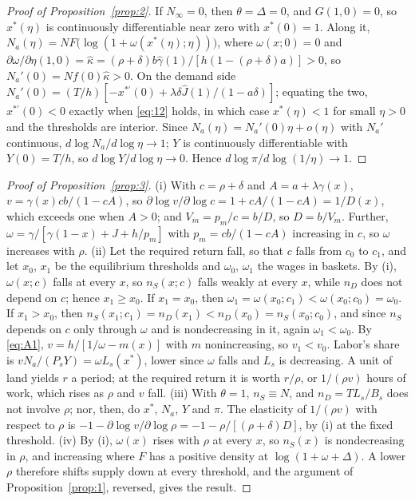 \documentclass[12pt]{article}
\theoremstyle{plain}
\begin{document}
\begin{proof}[Proof of Proposition~\ref{prop:2}]
If $N_\infty=0$, then $\theta=\Delta=0$, and $G(1,0)=0$, so $x^*(\eta)$ is continuously differentiable near zero with $x^*(0)=1$. Along it, $N_a(\eta)=NF\bigl(\log(1+\omega(x^*(\eta);\eta))\bigr)$, where $\omega(x;0)=0$ and $\partial\omega/\partial\eta(1,0)=\hat\kappa=(\rho+\delta)b\hat\gamma(1)/[h(1-(\rho+\delta)a)]>0$, so $N_a'(0)=Nf(0)\hat\kappa>0$. On the demand side $N_a'(0)=(T/h)[-x^{*\prime}(0)+\lambda\delta\hat J(1)/(1-a\delta)]$; equating the two, $x^{*\prime}(0)<0$ exactly when \eqref{eq:12} holds, in which case $x^*(\eta)<1$ for small $\eta>0$ and the thresholds are interior. Since $N_a(\eta)=N_a'(0)\eta+o(\eta)$ with $N_a'$ continuous, $d\log N_a/d\log\eta\to1$; $Y$ is continuously differentiable with $Y(0)=T/h$, so $d\log Y/d\log\eta\to0$. Hence $d\log\pi/d\log(1/\eta)\to1$.
\end{proof}

\begin{proof}[Proof of Proposition~\ref{prop:3}]
(i) With $c=\rho+\delta$ and $A=a+\lambda\gamma(x)$, $v=\gamma(x)cb/(1-cA)$, so $\partial\log v/\partial\log c=1+cA/(1-cA)=1/D(x)$, which exceeds one when $A>0$; and $V_m=p_m/c=b/D$, so $D=b/V_m$. Further, $\omega=\gamma/[\gamma(1-x)+J+h/p_m]$ with $p_m=cb/(1-cA)$ increasing in $c$, so $\omega$ increases with $\rho$.
(ii) Let the required return fall, so that $c$ falls from $c_0$ to $c_1$, and let $x_0$, $x_1$ be the equilibrium thresholds and $\omega_0$, $\omega_1$ the wages in baskets. By (i), $\omega(x;c)$ falls at every $x$, so $n_S(x;c)$ falls weakly at every $x$, while $n_D$ does not depend on $c$; hence $x_1\ge x_0$. If $x_1=x_0$, then $\omega_1=\omega(x_0;c_1)<\omega(x_0;c_0)=\omega_0$. If $x_1>x_0$, then $n_S(x_1;c_1)=n_D(x_1)<n_D(x_0)=n_S(x_0;c_0)$, and since $n_S$ depends on $c$ only through $\omega$ and is nondecreasing in it, again $\omega_1<\omega_0$. By \eqref{eq:A1}, $v=h/[1/\omega-m(x)]$ with $m$ nonincreasing, so $v_1<v_0$. Labor's share is $vN_a/(P_sY)=\omega L_s(x^*)$, lower since $\omega$ falls and $L_s$ is decreasing. A unit of land yields $r$ a period; at the required return it is worth $r/\rho$, or $1/(\rho v)$ hours of work, which rises as $\rho$ and $v$ fall.
(iii) With $\theta=1$, $n_S\equiv N$, and $n_D=TL_s/B_s$ does not involve $\rho$; nor, then, do $x^*$, $N_a$, $Y$ and $\pi$. The elasticity of $1/(\rho v)$ with respect to $\rho$ is $-1-\partial\log v/\partial\log\rho=-1-\rho/[(\rho+\delta)D]$, by (i) at the fixed threshold.
(iv) By (i), $\omega(x)$ rises with $\rho$ at every $x$, so $n_S(x)$ is nondecreasing in $\rho$, and increasing where $F$ has a positive density at $\log(1+\omega+\Delta)$. A lower $\rho$ therefore shifts supply down at every threshold, and the argument of Proposition~\ref{prop:1}, reversed, gives the result.
\end{proof}
\end{document}
